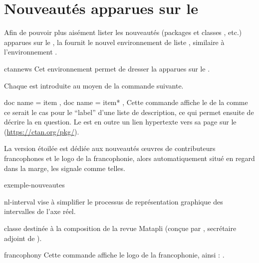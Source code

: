 \documentclass{letgut}
\begin{document}
\section{Nouveautés apparues sur le \ctan}
\label{sec:rubr-cons-aux}

Afin de pouvoir plus aisément lister les nouveautés (packages et classes
, etc.) apparues sur le \ctan{}, la  fournit le
nouvel environnement de liste , similaire à l'environnement
.
%
\begin{docEnvironment}[doclang/environment content=liste des nouveautés]{ctannews}{}
  Cet environnement permet de dresser la  apparues
  sur le \ctan{}.
\end{docEnvironment}
%
Chaque  est introduite au moyen de la commande 
suivante.
\begin{docCommands}[
  doc parameter = \oarg{nom},
  ]
  {
    { doc name = item },
    { doc name = item* },
  }
  Cette commande affiche le  de la  comme ce serait le
  cas pour le \enquote{label} d'une liste de description, ce qui permet ensuite
  de décrire la  en question. Le  est en outre un lien
  hypertexte vers sa page sur le \ctan{}
  (\url{https://ctan.org/pkg/}).

  La version étoilée  est dédiée aux nouveautés œuvres de
  contributeurs francophones et le logo de la francophonie, alors
  automatiquement situé en regard dans la marge, les signale comme telles.
\end{docCommands}

\begin{ltx-code-external-result}[title addon=nouveautés,listing options app={deletekeywords={[6]{hologo,matapli}}}]{exemple-nouveautes}
\begin{ctannews}
\item[nl-interval] vise à simplifier le processus de
  représentation graphique des intervalles de l'axe réel.
\item*[matapli] classe  destinée à la composition
  de la revue Matapli (conçue par ,
  secrétaire adjoint de \gutenberg{}).
\end{ctannews}
\end{ltx-code-external-result}

\begin{docCommand}{francophony}{}
  Cette commande affiche le logo de la francophonie, ainsi : \francophony.
\end{docCommand}
\end{document}
